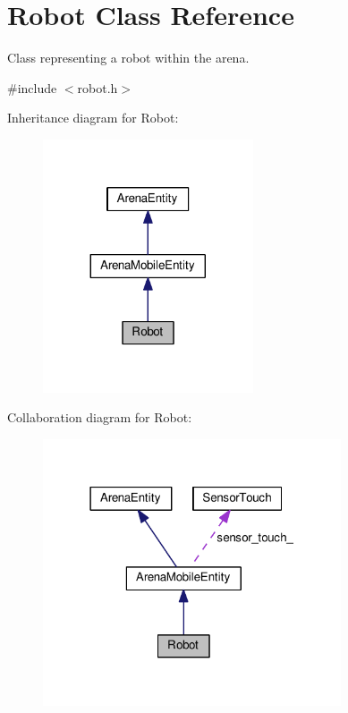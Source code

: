 \hypertarget{classRobot}{}\section{Robot Class Reference}
\label{classRobot}


Class representing a robot within the arena.  




{\ttfamily \#include $<$robot.\+h$>$}



Inheritance diagram for Robot\+:\nopagebreak
\begin{figure}[H]
\begin{center}
\leavevmode
\includegraphics[width=176pt]{classRobot__inherit__graph}
\end{center}
\end{figure}


Collaboration diagram for Robot\+:\nopagebreak
\begin{figure}[H]
\begin{center}
\leavevmode
\includegraphics[width=250pt]{classRobot__coll__graph}
\end{center}
\end{figure}
